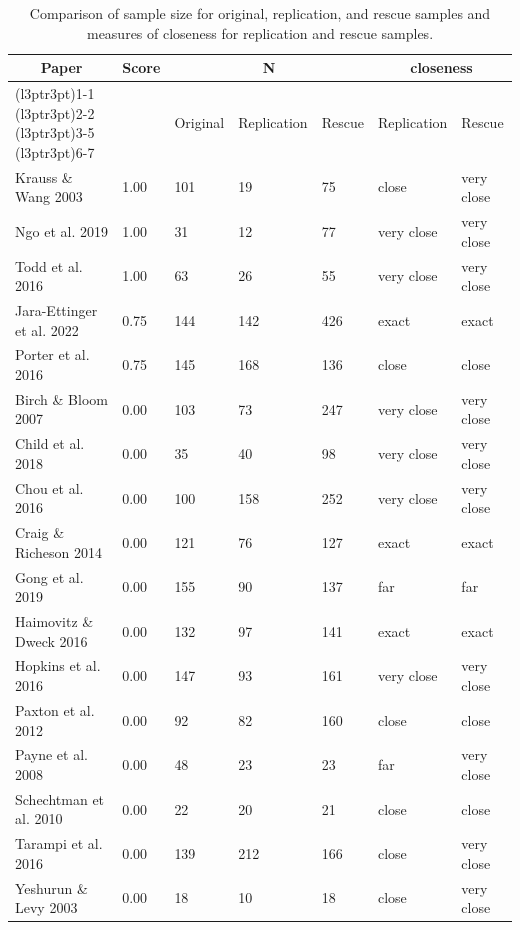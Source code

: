 \documentclass[
  english,
  a4paper,
]{article}
\begin{document}
\begin{table}

\caption{\label{tab:tab-size}Comparison of sample size for original, replication, and rescue samples and measures of closeness for replication and rescue samples.}
\centering
\begin{tabular}[t]{lllllll}
\toprule
\multicolumn{1}{c}{Paper} & \multicolumn{1}{c}{Score} & \multicolumn{3}{c}{N} & \multicolumn{2}{c}{closeness} \\
\cmidrule(l{3pt}r{3pt}){1-1} \cmidrule(l{3pt}r{3pt}){2-2} \cmidrule(l{3pt}r{3pt}){3-5} \cmidrule(l{3pt}r{3pt}){6-7}
 &  & Original & Replication & Rescue & Replication & Rescue\\
\midrule
Krauss \& Wang 2003 & 1.00 & 101 & 19 & 75 & close & very close\\
Ngo et al. 2019 & 1.00 & 31 & 12 & 77 & very close & very close\\
Todd et al. 2016 & 1.00 & 63 & 26 & 55 & very close & very close\\
Jara-Ettinger et al. 2022 & 0.75 & 144 & 142 & 426 & exact & exact\\
Porter et al. 2016 & 0.75 & 145 & 168 & 136 & close & close\\
Birch \& Bloom 2007 & 0.00 & 103 & 73 & 247 & very close & very close\\
Child et al. 2018 & 0.00 & 35 & 40 & 98 & very close & very close\\
Chou et al. 2016 & 0.00 & 100 & 158 & 252 & very close & very close\\
Craig \& Richeson 2014 & 0.00 & 121 & 76 & 127 & exact & exact\\
Gong et al. 2019 & 0.00 & 155 & 90 & 137 & far & far\\
Haimovitz \& Dweck 2016 & 0.00 & 132 & 97 & 141 & exact & exact\\
Hopkins et al. 2016 & 0.00 & 147 & 93 & 161 & very close & very close\\
Paxton et al. 2012 & 0.00 & 92 & 82 & 160 & close & close\\
Payne et al. 2008 & 0.00 & 48 & 23 & 23 & far & very close\\
Schechtman et al. 2010 & 0.00 & 22 & 20 & 21 & close & close\\
Tarampi et al. 2016 & 0.00 & 139 & 212 & 166 & close & very close\\
Yeshurun \& Levy 2003 & 0.00 & 18 & 10 & 18 & close & very close\\
\bottomrule
\end{tabular}
\end{table}
\end{document}
